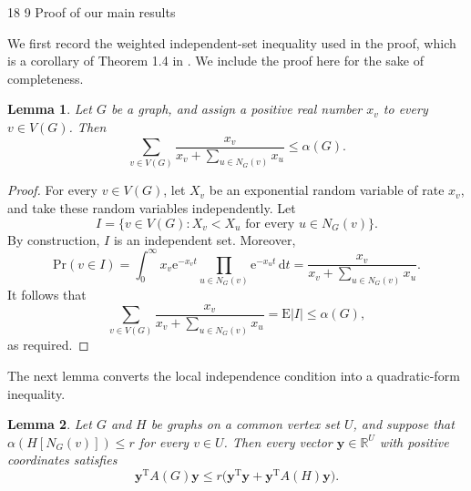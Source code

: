 \documentclass[11pt]{article}
\makeatletter
\renewcommand\section{\@startsection{section}{1}{\z@}%
{18\p@ \@plus 6\p@ \@minus 3\p@}%
{9\p@ \@plus 6\p@ \@minus 3\p@}%
{\large\bfseries\boldmath}}
\theoremstyle{plain}
\newtheorem{lemma}{Lemma}[section]
\theoremstyle{definition}
\numberwithin{equation}{section}
\makeatother
\begin{document}
\section{Proof of our main results}
\label{sec:main}

We first record the weighted independent-set inequality used in the proof, which is a corollary of Theorem 1.4 in \cite{Bansal-Harris2023}. We include the proof here for the sake of completeness.

\begin{lemma}\label{lem:weighted-CW}
Let $G$ be a graph, and assign a positive real number $x_v$ to every $v\in V(G)$. Then
\[
\sum_{v\in V(G)} \frac{x_v}{x_v + \sum_{u\in N_G(v)} x_u}
\leq \alpha(G).
\]
\end{lemma}

\begin{proof}
For every $v\in V(G)$, let $X_v$ be an exponential random variable of rate
$x_v$, and take these random variables independently. Let
\[
I = \{v\in V(G): X_v < X_u\text{ for every }u\in N_G(v)\}.
\]
By construction, $I$ is an independent set. Moreover,
\[
\mathrm{Pr}(v\in I)
= \int_0^\infty x_v \mathrm{e}^{-x_v t}
\prod_{u\in N_G(v)} \mathrm{e}^{-x_u t}\,\mathrm{d}t 
= \frac{x_v}{x_v + \sum_{u\in N_G(v)} x_u}.
\]
It follows that
\[
\sum_{v\in V(G)}
\frac{x_v}{x_v + \sum_{u\in N_G(v)} x_u}
=\mathrm{E}|I|
\leq \alpha(G),
\]
as required.
\end{proof}

The next lemma converts the local independence condition into a quadratic-form inequality. 

\begin{lemma}\label{lem:matrix}
Let $G$ and $H$ be graphs on a common vertex set $U$, and suppose that
$\alpha (H[N_G(v)])\leq r$ for every $v\in U$. Then every vector 
$\bm{y}\in\mathbb{R}^U$ with positive coordinates satisfies
\[
\bm{y}^{\mathrm{T}} A(G) \bm{y}
\leq r\big(\bm{y}^{\mathrm{T}} \bm{y} + \bm{y}^{\mathrm{T}} A(H) \bm{y}\big).
\]
\end{lemma}
\end{document}
